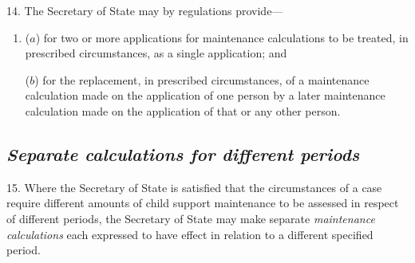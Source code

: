 \documentclass[12pt,a4paper]{article}
\begin{document}
%
%
%
%
%

14. The Secretary of State may by regulations provide—
\begin{enumerate}\item[]
($a$) for two or more applications for maintenance calculations to be treated, in prescribed circumstances, as a single application; and

($b$) for the replacement, in prescribed circumstances, of a maintenance calculation made on the application of one person by a later maintenance calculation made on the application of that or any other person.
\end{enumerate}


\subsection*{\itshape Separate 
\emph{calculations}  %
for different periods}

15. Where 
the 
Secretary of State  %
is satisfied that the circumstances of a case require different amounts of child support maintenance to be assessed in respect of different periods, 
the Secretary of State  %
may make separate 
\emph{maintenance calculations}  %
each expressed to have effect in relation to a different specified period.
\end{document}
